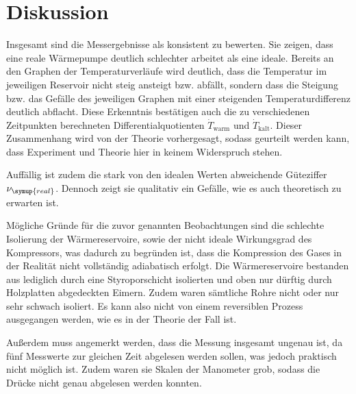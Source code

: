 \section{Diskussion}
\label{sec:Diskussion}

Insgesamt sind die Messergebnisse als konsistent zu bewerten. Sie zeigen, dass eine
reale Wärmepumpe deutlich schlechter arbeitet als eine ideale.
Bereits an den Graphen der Temperaturverläufe wird deutlich, dass die Temperatur
im jeweiligen Reservoir nicht steig ansteigt bzw. abfällt, sondern dass die
Steigung bzw. das Gefälle des jeweiligen Graphen mit einer steigenden Temperaturdifferenz
deutlich abflacht. Diese Erkenntnis bestätigen auch die zu verschiedenen Zeitpunkten
berechneten Differentialquotienten $\dot{T}_\text{warm}$ und $\dot{T}_\text{kalt}$.
Dieser Zusammenhang wird von der Theorie vorhergesagt, sodass geurteilt werden kann,
dass Experiment und Theorie hier in keinem Widerspruch stehen.

Auffällig ist zudem die stark von den idealen Werten abweichende Güteziffer $\nu_{\symup{real}}$.
Dennoch zeigt sie qualitativ ein Gefälle, wie es auch theoretisch zu erwarten ist.

Mögliche Gründe für die zuvor genannten Beobachtungen sind die schlechte Isolierung der Wärmereservoire, sowie
der nicht ideale Wirkungsgrad des Kompressors, was dadurch zu begründen ist, dass die Kompression des Gases
in der Realität nicht vollständig adiabatisch erfolgt. Die Wärmereservoire bestanden
aus lediglich durch eine Styroporschicht isolierten und oben nur dürftig durch Holzplatten
abgedeckten Eimern. Zudem waren sämtliche Rohre nicht oder nur sehr schwach isoliert.
Es kann also nicht von einem reversiblen Prozess ausgegangen werden, wie es in der
Theorie der Fall ist.

Außerdem muss angemerkt werden, dass die Messung insgesamt ungenau ist, da fünf Messwerte
zur gleichen Zeit abgelesen werden sollen, was jedoch praktisch nicht möglich ist.
Zudem waren sie Skalen der Manometer grob, sodass die Drücke nicht genau abgelesen
werden konnten.
